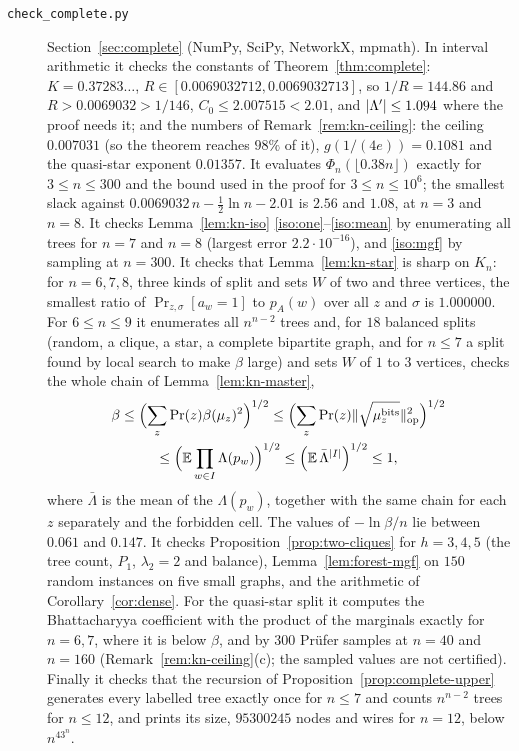 \begin{description}
\item[\texttt{check\_complete.py}] Section~\ref{sec:complete} (NumPy, SciPy, NetworkX, mpmath). In interval arithmetic it checks the constants of Theorem~\ref{thm:complete}: $K=0.37283\ldots$, $R\in[0.0069032712,0.0069032713]$, so $1/R=144.86$ and $R>0.0069032>1/146$, $C_0\le2.007515<2.01$, and $\lvert \Lambda'\rvert\le1.094$ where the proof needs it; and the numbers of Remark~\ref{rem:kn-ceiling}: the ceiling $0.007031$ (so the theorem reaches $98\%$ of it), $g(1/(4e))=0.1081$ and the quasi-star exponent $0.01357$. It evaluates $\Phi_n(\lfloor0.38n\rfloor)$ exactly for $3\le n\le300$ and the bound used in the proof for $3\le n\le10^6$; the smallest slack against $0.0069032\,n-\frac12\ln n-2.01$ is $2.56$ and $1.08$, at $n=3$ and $n=8$. It checks Lemma~\ref{lem:kn-iso} \ref{iso:one}--\ref{iso:mean} by enumerating all trees for $n=7$ and $n=8$ (largest error $2.2\cdot10^{-16}$), and \ref{iso:mgf} by sampling at $n=300$. It checks that Lemma~\ref{lem:kn-star} is sharp on $K_n$: for $n=6,7,8$, three kinds of split and sets $W$ of two and three vertices, the smallest ratio of $\Pr_{z,\sigma}[a_w=1]$ to $p_A(w)$ over all $z$ and $\sigma$ is $1.000000$. For $6\le n\le9$ it enumerates all $n^{n-2}$ trees and, for $18$ balanced splits (random, a clique, a star, a complete bipartite graph, and for $n\le7$ a split found by local search to make $\beta$ large) and sets $W$ of $1$ to $3$ vertices, checks the whole chain of Lemma~\ref{lem:kn-master},
\begin{multline*}
  \beta\le\Bigl(\sum_z\Pr(z)\beta(\mu_z)^2\Bigr)^{1/2}\le\Bigl(\sum_z\Pr(z)\lVert \sqrt{\mu_z^{\mathrm{bits}}}\rVert_{\mathrm{op}}^2\Bigr)^{1/2}\\
  \le\Bigl(\mathbb{E}\prod_{w\in I}\Lambda(p_w)\Bigr)^{1/2}\le\Bigl(\mathbb{E}\,\bar\Lambda^{\lvert I\rvert}\Bigr)^{1/2}\le1,
\end{multline*}
where $\bar\Lambda$ is the mean of the $\Lambda(p_w)$, together with the same chain for each $z$ separately and the forbidden cell. The values of $-\ln\beta/n$ lie between $0.061$ and $0.147$. It checks Proposition~\ref{prop:two-cliques} for $h=3,4,5$ (the tree count, $P_1$, $\lambda_2=2$ and balance), Lemma~\ref{lem:forest-mgf} on $150$ random instances on five small graphs, and the arithmetic of Corollary~\ref{cor:dense}. For the quasi-star split it computes the Bhattacharyya coefficient with the product of the marginals exactly for $n=6,7$, where it is below $\beta$, and by $300$ Pr\"ufer samples at $n=40$ and $n=160$ (Remark~\ref{rem:kn-ceiling}(c); the sampled values are not certified). Finally it checks that the recursion of Proposition~\ref{prop:complete-upper} generates every labelled tree exactly once for $n\le7$ and counts $n^{n-2}$ trees for $n\le12$, and prints its size, $95300245$ nodes and wires for $n=12$, below $n^43^n$.


\end{description}
